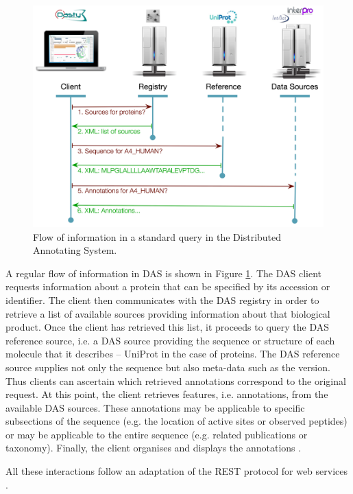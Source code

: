 \begin{figure}  
\centering
\includegraphics[width=5in]{figures/DAS.png}
\caption[DAS Flow of Information.]{Flow of information in a standard query in the Distributed Annotating System.
\label{fig:das}}
\end{figure}

A regular flow of information in DAS is shown in Figure \ref{fig:das}. The DAS client requests information about a protein that can be specified by its accession or identifier. The client then communicates with the DAS registry in order to retrieve a list of available sources providing information about that biological product. Once the client has retrieved this list, it proceeds to query the DAS reference source, i.e. a DAS source providing the sequence or structure of each molecule that it describes -- UniProt in the case of proteins. The DAS reference source supplies not only the sequence but also meta-data such as the version. Thus clients can ascertain which retrieved annotations correspond to the original request. At this point, the client retrieves features, i.e. annotations, from the available DAS sources. These annotations may be applicable to specific subsections of the sequence (e.g. the location of active sites or observed peptides) or may be applicable to the entire sequence (e.g. related publications or taxonomy). Finally, the client organises and displays the annotations \cite{SAL2010}. 

All these interactions follow an adaptation of the REST protocol for web services \cite{PRL2007} .

